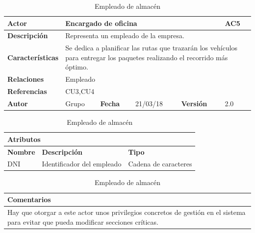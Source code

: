\documentclass[12pt,spanish]{article}
\begin{document}
\begin{table}[H]

\centering
\begin{tabular}{|m{3cm}|m{4cm}|m{2cm}|m{2cm}|m{2cm}|m{1cm}|}
\hline
\textbf{Actor} &  \multicolumn{4}{m{8cm}|}{Encargado de oficina} \vline &  \cellcolor{gray!40}AC5 \\
\hline
\textbf{Descripción} & \multicolumn{5}{m{8cm}|}{Representa un empleado de la empresa.} \\
\hline
\textbf{Características} & \multicolumn{5}{m{8cm}|}{Se dedica a planificar las rutas que trazarán los vehículos para entregar los paquetes realizando el recorrido más óptimo.} \\
\hline
\textbf{Relaciones} &\multicolumn{5}{m{8cm}|}{Empleado} \\
\hline
\textbf{Referencias} & \multicolumn{5}{m{8cm}|}{CU3,CU4} \\
\hline
\textbf{Autor} & Grupo & \textbf{Fecha} & 21/03/18 & \textbf{Versión} & 2.0 \\
\hline
\end{tabular}

\vspace{1cm}

\begin{tabular}{|m{4cm}|m{7.3cm}|m{4cm}|}
\hline
\multicolumn{3}{|m{15.3cm}|}{\textbf{Atributos}} \\
\hline
\textbf{Nombre} & \textbf{Descripción} & \textbf{Tipo} \\
\hline
DNI & Identificador del empleado & Cadena de caracteres \\
\hline
\end{tabular}


\vspace{1cm}

\begin{tabular}{|m{16.2cm}|}
\hline
\textbf{Comentarios} \\
\hline
Hay que otorgar a este actor unos privilegios concretos de gestión en el sistema para evitar que pueda modificar secciones críticas. \\
\hline
\end{tabular}

\caption{Empleado de almacén}

\end{table}
\end{document}
